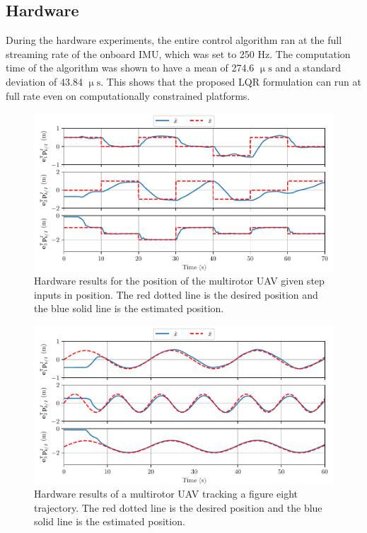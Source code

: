 
\subsection{Hardware}

During the hardware experiments, the entire control algorithm ran at the
full streaming rate of the onboard IMU, which was set to 250 Hz. The computation
time of the algorithm was shown to have a mean of 274.6 $\upmu \mathrm{s}$ and a standard
deviation of 43.84 $\upmu \mathrm{s}$. This shows that the proposed LQR
formulation can run at full rate even on computationally constrained platforms.

\begin{figure}
  \centering
  \includegraphics[width=6.5in]{figures/mocap_wps_position}
  \caption[LQR Hardware Results Flying Waypoints]{Hardware results for the position of the multirotor UAV given step
  inputs in position. The red dotted line is the desired position and the blue
solid line is the estimated position.}
  \label{f:hardware_wps}
\end{figure}

\begin{figure}
  \centering
  \includegraphics[width=6.5in]{figures/mocap_fig8_position}
  \caption[LQR Hardware Results Flying a Trajectory]{Hardware results of a multirotor UAV tracking a figure eight
  trajectory. The red dotted line is the desired position and the blue solid
line is the estimated position.}
  \label{f:hardware_fig8}
\end{figure}

